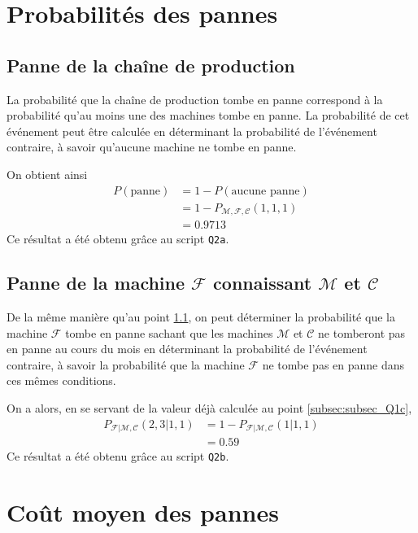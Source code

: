 \documentclass[a4paper, 12pt]{article}
\newcommand{\M}{\mathcal{M}}
\newcommand{\F}{\mathcal{F}}
\newcommand{\C}{\mathcal{C}}
\begin{document}
	\section{Probabilités des pannes}
	\subsection{Panne de la chaîne de production}
	\label{subsec:subsec_Q2a}
	La probabilité que la chaîne de production tombe en panne correspond à la probabilité qu'au moins une des machines tombe en panne. La probabilité de cet événement peut être calculée en déterminant la probabilité de l'événement contraire, à savoir qu'aucune machine ne tombe en panne.\par
	On obtient ainsi 
	\begin{align*}
	    P\left(\text{panne}\right) &= 1 - P\left(\text{aucune panne}\right)\\
	    &= 1 - P_{\M,\F,\C}\left(1,1,1\right)\\
	    &= \num{0.9713}
	\end{align*}
	Ce résultat a été obtenu grâce au script \texttt{Q2a}.
	\subsection{Panne de la machine \(\F\) connaissant \(\M\) et \(\C\)}
	De la même manière qu'au point \ref{subsec:subsec_Q2a}, on peut déterminer la probabilité que la machine $\F$ tombe en panne sachant que les machines $\M$ et $\C$ ne tomberont pas en panne au cours du mois en déterminant la probabilité de l'événement contraire, à savoir la probabilité que la machine \(\F\) ne tombe pas en panne dans ces mêmes conditions.\par
	On a alors, en se servant de la valeur déjà calculée au point \ref{subsec:subsec_Q1c},
	\begin{align*}
	    P_{\F|\M,\C}\left(2,3|1,1\right) &= 1 - P_{\F|\M,\C}\left(1|1,1\right)\\
	    &= \num{0.59}
	\end{align*}
	Ce résultat a été obtenu grâce au script \texttt{Q2b}.
	\section{Coût moyen des pannes}
\end{document}
